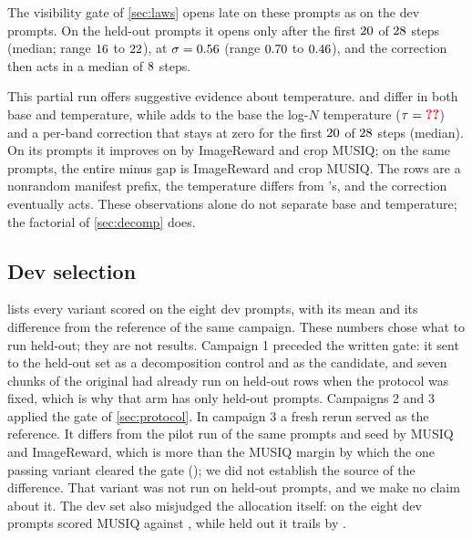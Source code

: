 The visibility gate of \cref{sec:laws} opens late on these prompts as on the dev prompts. On the \NmechConstN{} held-out prompts it opens only after the first $20$ of $28$ steps (median; range $16$ to $22$), at $\sigma=0.56$ (range $0.70$ to $0.46$), and the correction then acts in a median of $8$ steps.

This partial run offers suggestive evidence about temperature. \ntk{} and \tempsb{} differ in both base and temperature, while \constancy{} adds to the \ntk{} base the log-$N$ temperature ($\tau=\N{c@taulogn}$) and a per-band correction that stays at zero for the first $20$ of $28$ steps (median). On its  prompts it improves on \ntk{} by  ImageReward and  crop MUSIQ; on the same prompts, the entire \segaofficial{} minus \ntk{} gap is  ImageReward and  crop MUSIQ. The rows are a nonrandom manifest prefix, the temperature differs from \sega's, and the correction eventually acts. These observations alone do not separate base and temperature; the factorial of \cref{sec:decomp} does.

\subsection{Dev selection}\label{app:dev}

 lists every variant scored on the eight dev prompts, with its mean and its difference from the \segaofficial{} reference of the same campaign. These numbers chose what to run held-out; they are not results. Campaign 1 preceded the written gate: it sent \tempsb{} to the held-out set as a decomposition control and \constancytm{} as the candidate, and seven chunks of the original \constancy{} had already run on held-out rows when the protocol was fixed, which is why that arm has only  held-out prompts. Campaigns 2 and 3 applied the gate of \cref{sec:protocol}. In campaign 3 a fresh \segaofficial{} rerun served as the reference. It differs from the pilot run of the same prompts and seed by  MUSIQ and  ImageReward, which is more than the MUSIQ margin by which the one passing variant cleared the gate (); we did not establish the source of the difference. That variant was not run on held-out prompts, and we make no claim about it. The dev set also misjudged the allocation itself: on the eight dev prompts \tempsb{} scored  MUSIQ against \segaofficial, while held out it trails by .

